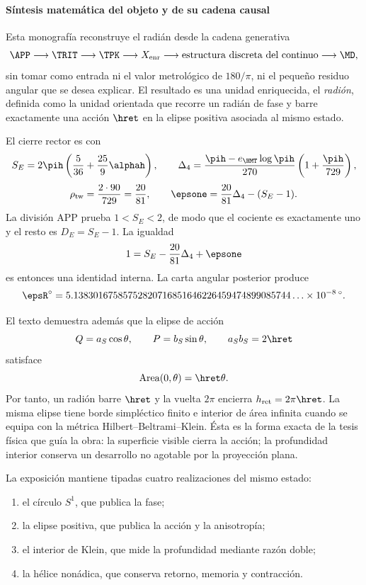 \paragraph{Síntesis matemática del objeto y de su cadena causal}

Esta monografía reconstruye el radián desde la cadena generativa
\[
\APP\longrightarrow\TRIT\longrightarrow\TPK
\longrightarrow X_{\mathrm{enr}}
\longrightarrow\text{estructura discreta del continuo}
\longrightarrow\MD,
\]
sin tomar como entrada ni el valor metrológico de \(180/\pi\), ni el pequeño
residuo angular que se desea explicar. El resultado es una unidad enriquecida,
el \emph{radión}, definida como la unidad orientada que recorre un radián de
fase y barre exactamente una acción \(\hret\) en la elipse positiva asociada
al mismo estado.

El cierre rector es
\BigRadionEquation
con
\[
S_E=2\pih\left(\frac5{36}+\frac{25}{9}\alphah\right),
\qquad
\Delta_4=
\frac{\pih-e_{\HMT}\log\pih}{270}
\left(1+\frac{\pih}{729}\right),
\]
\[
\rho_{\mathrm{tw}}=\frac{2\cdot90}{729}=\frac{20}{81},
\qquad
\epsone=\frac{20}{81}\Delta_4-(S_E-1).
\]
La división APP prueba \(1<S_E<2\), de modo que el cociente es exactamente
uno y el resto es \(D_E=S_E-1\). La igualdad
\[
1=S_E-\frac{20}{81}\Delta_4+\epsone
\]
es entonces una identidad interna. La carta angular posterior produce
\[
\epsR^\circ
=5.13830167585752820716851646226459474899085744\ldots
\times10^{-8}\,{}^\circ.
\]

El texto demuestra además que la elipse de acción
\[
Q=a_S\cos\theta,\qquad P=b_S\sin\theta,\qquad
a_Sb_S=2\hret
\]
satisface
\[
\operatorname{Area}(0,\theta)=\hret\theta.
\]
Por tanto, un radión barre \(\hret\) y la vuelta \(2\pi\) encierra
\(h_{\mathrm{ret}}=2\pi\hret\). La misma elipse tiene borde simpléctico
finito e interior de área infinita cuando se equipa con la métrica
Hilbert--Beltrami--Klein. Ésta es la forma exacta de la tesis física que guía
la obra: la superficie visible cierra la acción; la profundidad interior
conserva un desarrollo no agotable por la proyección plana.

La exposición mantiene tipadas cuatro realizaciones del mismo estado:

\begin{enumerate}[label=\textbf{\arabic*.}]
\item el círculo \(S^1\), que publica la fase;
\item la elipse positiva, que publica la acción y la anisotropía;
\item el interior de Klein, que mide la profundidad mediante razón doble;
\item la hélice nonádica, que conserva retorno, memoria y contracción.
\end{enumerate}

